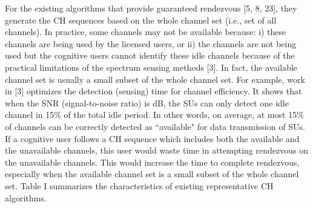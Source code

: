 \documentclass[journal]{IEEEtran}
\begin{document}
\par For the existing algorithms that provide guaranteed rendezvous [5, 8, 23], they generate the CH sequences based on the whole channel set (i.e., set of all channels). In practice, some channels may not be available because: i) these channels are being used by the licensed users, or ii) the channels are not being used but the cognitive users cannot identify these idle channels because of the practical limitations of the spectrum sensing methods [3]. In fact, the available channel set is usually a small subset of the whole channel set. For example, work in [3] optimizes the detection (sensing) time for channel efficiency. It shows that when the SNR (signal-to-noise ratio) is dB, the SUs can only detect one idle channel in 15\% of the total idle period. In other words, on average, at most 15\% of channels can be correctly detected as ``available" for data transmission of SUs. If a cognitive user follows a CH sequence which includes both the available and the unavailable channels, this user would waste time in attempting rendezvous on the unavailable channels. This would increase the time to complete rendezvous, especially when the available channel set is a small subset of the whole channel set. Table I summarizes the characteristics of existing representative CH algorithms.
\end{document}
